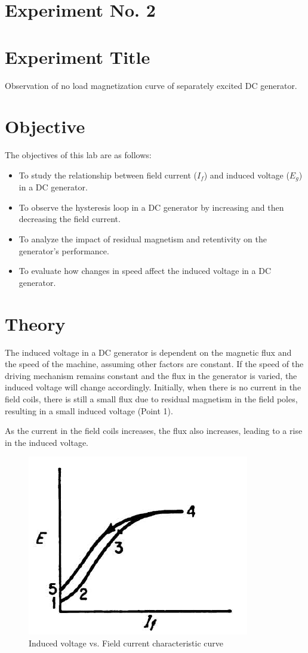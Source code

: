 \documentclass[a4paper,12pt]{article}
\begin{document}
	\section{Experiment No. 2}
	
	\section{Experiment Title }
	Observation of no load magnetization curve of separately excited DC generator.
	\section{Objective}
	
	The objectives of this lab are as follows:
	
	\begin{itemize}
		\item To study the relationship between field current ($I_f$) and induced voltage ($E_g$) in a DC generator.
		\item To observe the hysteresis loop in a DC generator by increasing and then decreasing the field current.
		\item To analyze the impact of residual magnetism and retentivity on the generator's performance.
		\item To evaluate how changes in speed affect the induced voltage in a DC generator.
	\end{itemize}
	\section{Theory}
	
	The induced voltage in a DC generator is dependent on the magnetic flux and the speed of the machine, assuming other factors are constant. If the speed of the driving mechanism remains constant and the flux in the generator is varied, the induced voltage will change accordingly. Initially, when there is no current in the field coils, there is still a small flux due to residual magnetism in the field poles, resulting in a small induced voltage (Point 1). 
	
	As the current in the field coils increases, the flux also increases, leading to a rise in the induced voltage.
	
	\begin{figure}[H]
		\centering
		\includegraphics[width=0.4\linewidth]{Images/1} %
		\caption{Induced voltage vs. Field current characteristic curve}
		\label{fig:1}
	\end{figure}
	
\end{document}
